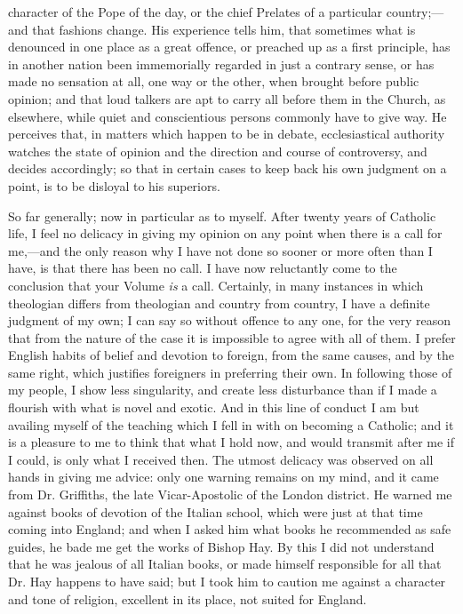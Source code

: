 character of the Pope of the day, or the chief Prelates of a
particular country;—and that fashions change. His experience tells
him, that sometimes what is denounced in one place as a great offence,
or preached up as a first principle, has in another nation been
immemorially regarded in just a contrary sense, or has made no sensation
at all, one way or the other, when brought before public opinion; and
that loud talkers are apt to carry all before them in the Church, as
elsewhere, while quiet and conscientious persons commonly have to give
way. He perceives that, in matters which happen to be in debate,
ecclesiastical authority watches the state of opinion and the direction
and course of controversy, and decides accordingly; so that in certain
cases to keep back his own judgment on a point, is to be disloyal to his
superiors.

So far generally; now in particular as to myself. After twenty years
of Catholic life, I feel no delicacy in giving my opinion on any point
when there is a call for me,—and the only reason why I have not done
so sooner or more often than I have, is that there has been no call. I
have now reluctantly come to the conclusion that your Volume \emph{is} a
call. Certainly, in many instances in which theologian differs from
theologian and country from country, I have a definite judgment of my
own; I can say so without offence to any one, for the very reason that
from the nature of the case it is impossible to agree with all of them.
I prefer English habits of belief and devotion to foreign, from the same
causes, and by the same right, which justifies foreigners in preferring
their own. In following those of my people, I show less singularity, and
create less disturbance than if I made a flourish with what is
novel and exotic. And in this line of conduct I am but availing myself
of the teaching which I fell in with on becoming a Catholic; and it is a
pleasure to me to think that what I hold now, and would transmit after
me if I could, is only what I received then. The utmost delicacy was
observed on all hands in giving me advice: only one warning remains on
my mind, and it came from Dr. Griffiths, the late Vicar-Apostolic of the
London district. He warned me against books of devotion of the Italian
school, which were just at that time coming into England; and when I
asked him what books he recommended as safe guides, he bade me get the
works of Bishop Hay. By this I did not understand that he was jealous of
all Italian books, or made himself responsible for all that Dr. Hay
happens to have said; but I took him to caution me against a character
and tone of religion, excellent in its place, not suited for England.

